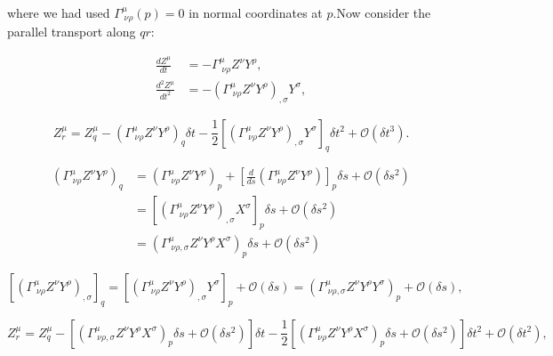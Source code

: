             where we had used $\Gamma^{\mu}_{\;\nu\rho}(p)=0$ in normal coordinates at $p.$Now consider the parallel transport along $qr$:


            \begin{align}
                \frac{dZ^{\mu}}{dt} &= -\Gamma^{\mu}_{\;\nu\rho}Z^{\nu}Y^{\rho},\\
                \frac{d^2Z^{\mu}}{dt^2} &= - \left(\Gamma^{\mu}_{\;\nu\rho}Z^{\nu}Y^{\rho} \right)_{,\sigma}Y^{\sigma},
            \end{align}

            \begin{equation}
                Z^{\mu}_r = Z^{\mu}_q - \left(\Gamma^{\mu}_{\;\nu\rho}Z^{\nu}Y^{\rho} \right)_q\delta t - \frac{1}{2}\left[\left(\Gamma^{\mu}_{\;\nu\rho}Z^{\nu}Y^{\rho} \right)_{,\sigma}Y^{\sigma} \right]_q\delta t^2 + \mathcal{O}(\delta t^3).
            \end{equation}

            

            \begin{align}
                \left(\Gamma^{\mu}_{\;\nu\rho}Z^{\nu}Y^{\rho} \right)_q &= \left(\Gamma^{\mu}_{\;\nu\rho}Z^{\nu}Y^{\rho} \right)_p + \left[\frac{d}{ds}\left(\Gamma^{\mu}_{\;\nu\rho}Z^{\nu}Y^{\rho} \right) \right]_p\delta s + \mathcal{O}(\delta s^2)\\
                &= \left[\left(\Gamma^{\mu}_{\;\nu\rho}Z^{\nu}Y^{\rho} \right)_{,\sigma} X^{\sigma}\right]_p\delta s + \mathcal{O}(\delta s^2)\\
                &= \left(\Gamma^{\mu}_{\;\nu\rho,\sigma}Z^{\nu}Y^{\rho}X^{\sigma} \right)_p\delta s + \mathcal{O}(\delta s^2)
            \end{align}

            \begin{equation}
                \left[\left(\Gamma^{\mu}_{\;\nu\rho}Z^{\nu}Y^{\rho} \right)_{,\sigma} \right]_q = \left[\left(\Gamma^{\mu}_{\;\nu\rho}Z^{\nu}Y^{\rho} \right)_{,\sigma}Y^{\sigma} \right]_p + \mathcal{O}(\delta s) = \left(\Gamma^{\mu}_{\;\nu\rho,\sigma}Z^{\nu}Y^{\rho}Y^{\sigma} \right)_p + \mathcal{O}(\delta s),
            \end{equation}

            \begin{equation}
                Z^{\mu}_r = Z^{\mu}_q - \left[\left(\Gamma^{\mu}_{\;\nu\rho,\sigma}Z^{\nu}Y^{\rho}X^{\sigma} \right)_p \delta s + \mathcal{O}(\delta s^2)\right]\delta t - \frac{1}{2}\left[\left(\Gamma^{\mu}_{\;\nu\rho}Z^{\nu}Y^{\rho}X^{\sigma} \right)_p \delta s + \mathcal{O}(\delta s^2) \right]\delta t^2 + \mathcal{O}(\delta t^2),
            \end{equation}

